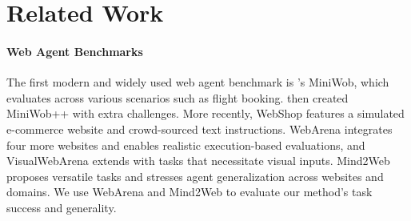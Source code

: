 \section{Related Work}
\vspace{-1mm}

\paragraph{Web Agent Benchmarks}
The first modern and widely used web agent benchmark is \citet{shi2017world}'s MiniWob, which evaluates across various scenarios such as flight booking. \citep{zheran2018reinforcement} then created MiniWob++ with extra challenges.
More recently, WebShop \citep{yao2022webshop} features a simulated e-commerce website and crowd-sourced text instructions. WebArena \citep{zhou2024webarena} integrates four more websites and enables realistic execution-based evaluations, and VisualWebArena \citep{koh2024visualwebarena} extends with tasks that necessitate visual inputs.
Mind2Web \citep{deng2023mindweb} proposes versatile tasks and stresses agent generalization across websites and domains.
We use WebArena and Mind2Web to evaluate our method's task success and generality.

\vspace{-1mm}
